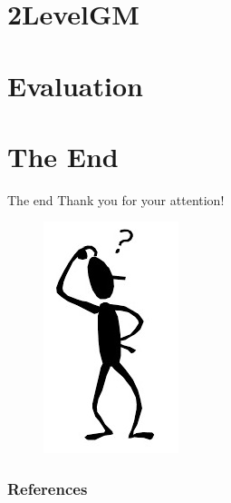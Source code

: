 \documentclass[hyperref={pdfpagelabels=false}]{beamer}
\begin{document}
\section{2LevelGM} 


\section{Evaluation} 

\section*{The End}
\begin{frame}{The end}
\centering
\LARGE
\color{red}
Thank you for your attention!
\end{frame}
\begin{frame}
\centering
\begin{figure}
	\includegraphics{who.png}
\end{figure}
\end{frame}
\begin{frame}[allowframebreaks]
	\frametitle{References}
	
	
\end{frame} 
\end{document}
